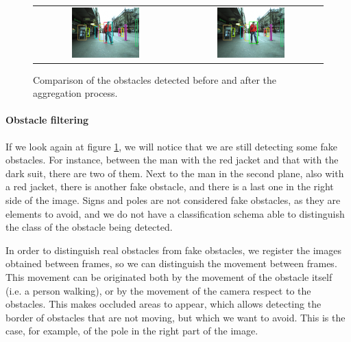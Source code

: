 \begin{figure}[h!]
\begin{tabular}{cc}
\includegraphics[width=0.49\textwidth]{obstaclesBeforeAggregation}\label{fig:cp04_before_aggregation} &
\includegraphics[width=0.49\textwidth]{obstaclesAggregated}\label{fig:cp04_after_aggregation}
\end{tabular}
\caption{Comparison of the obstacles detected before and after the aggregation process.}\label{fig:cp04_clustering_aggregation}
\end{figure}

\paragraph{Obstacle filtering}\label{ch:chapter04_01_04_01_02}

If we look again at figure \ref{fig:cp04_clustering_aggregation}, we will notice that we are still detecting some fake obstacles. For instance, between the man with the red jacket and that with the dark suit, there are two of them. Next to the man in the second plane, also with a red jacket, there is another fake obstacle, and there is a last one in the right side of the image. Signs and poles are not considered fake obstacles, as they are elements to avoid, and we do not have a classification schema able to distinguish the class of the obstacle being detected.

In order to distinguish real obstacles from fake obstacles, we register the images obtained between frames, so we can distinguish the movement between frames. This movement can be originated both by the movement of the obstacle itself (i.e. a person walking), or by the movement of the camera respect to the obstacles. This makes occluded areas to appear, which allows detecting the border of obstacles that are not moving, but which we want to avoid. This is the case, for example, of the pole in the right part of the image.

